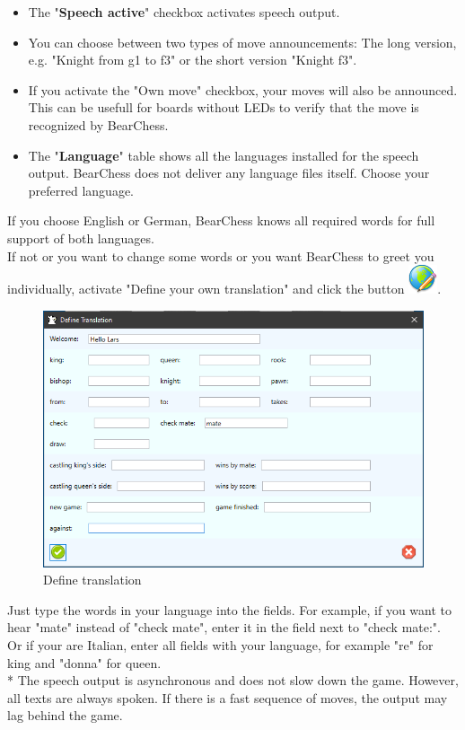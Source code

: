 \documentclass[11pt,a4paper]{article}
\begin{document}
\begin{itemize}
  \item The "\textbf{Speech active}" checkbox activates speech output.
  \item You can choose between two types of move announcements: The long version, e.g. "Knight from g1 to f3" or the short version "Knight f3".
  \item If you activate the "Own move" checkbox, your moves will also be announced. This can be usefull for boards without LEDs to verify that the move is recognized by BearChess.
  \item The "\textbf{Language}" table shows all the languages installed for the speech output. BearChess does not deliver any language files itself. Choose your preferred language. 
\end{itemize}
If you choose English or German, BearChess knows all required words for full support of both languages.\\
If not or you want to change some words or you want BearChess to greet you individually, activate "Define your own translation" and click the button \includegraphics[scale=0.5]{world_edit.png}.

 \begin{figure}[H]
	\centering
	\includegraphics[scale=0.7]{Sounds3.png}
	\caption{Define translation}
	\label{fig:Sounds3}
\end{figure}
Just type the words in your language into the fields. For example, if you want to hear "mate" instead of "check mate", enter it in the field next to "check mate:".\\
Or if your are Italian, enter all fields with your language, for example "re" for king and "donna" for queen.\\
{\color{red}*} The speech output is asynchronous and does not slow down the game. However, all texts are always spoken. If there is a fast sequence of moves, the output may lag behind the game.
\end{document}
